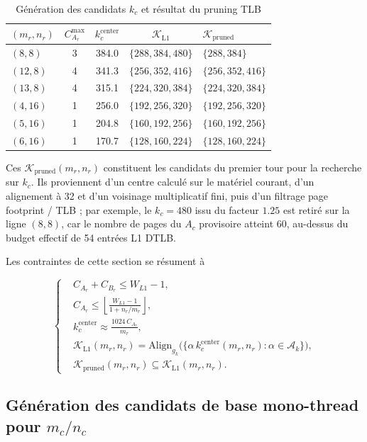 \documentclass[a4paper,11pt,oneside]{article}
\begin{document}
\begin{table}[H]
\centering
\begin{tabular}{lcccl}
\toprule
\textbf{$(m_r,n_r)$} & $C_{A_r}^{\max}$ & $k_c^{\text{center}}$ & \textbf{$\mathcal{K}_{\mathrm{L1}}$} & \textbf{$\mathcal{K}_{\mathrm{pruned}}$} \\
\midrule
$(8,8)$   & 3 & 384.0 & $\{288,384,480\}$ & $\{288,384\}$ \\
$(12,8)$  & 4 & 341.3 & $\{256,352,416\}$ & $\{256,352,416\}$ \\
$(13,8)$  & 4 & 315.1 & $\{224,320,384\}$ & $\{224,320,384\}$ \\
$(4,16)$  & 1 & 256.0 & $\{192,256,320\}$ & $\{192,256,320\}$ \\
$(5,16)$  & 1 & 204.8 & $\{160,192,256\}$ & $\{160,192,256\}$ \\
$(6,16)$  & 1 & 170.7 & $\{128,160,224\}$ & $\{128,160,224\}$ \\
\bottomrule
\end{tabular}
\caption{Génération des candidats $k_c$ et résultat du pruning TLB}
\label{tab:appendix_kc_candidates}
\end{table}

Ces $\mathcal{K}_{\mathrm{pruned}}(m_r,n_r)$ constituent les candidats du premier tour pour la recherche sur $k_c$. Ils proviennent d'un centre calculé sur le matériel courant, d'un alignement à 32 et d'un voisinage multiplicatif fini, puis d'un filtrage page footprint / TLB ; par exemple, le $k_c=480$ issu du facteur $1.25$ est retiré sur la ligne $(8,8)$, car le nombre de pages du $A_c$ provisoire atteint 60, au-dessus du budget effectif de 54 entrées L1 DTLB.

Les contraintes de cette section se résument à

$$
\left\{
\begin{aligned}
&C_{A_r} + C_{B_r} \le W_{L1} - 1,\\
&C_{A_r} \le \left\lfloor \frac{W_{L1}-1}{1+n_r/m_r} \right\rfloor,\\
&k_c^{\text{center}} \approx \frac{1024\,C_{A_r}}{m_r},\\
&\mathcal{K}_{\mathrm{L1}}(m_r,n_r) = \mathrm{Align}_{g_k}\bigl(\{ \alpha\, k_c^{\text{center}}(m_r,n_r) : \alpha \in \mathcal{A}_k \}\bigr),\\
&\mathcal{K}_{\mathrm{pruned}}(m_r,n_r) \subseteq \mathcal{K}_{\mathrm{L1}}(m_r,n_r).
\end{aligned}
\right.
$$

\subsection{Génération des candidats de base mono-thread pour $m_c/n_c$}
\end{document}
